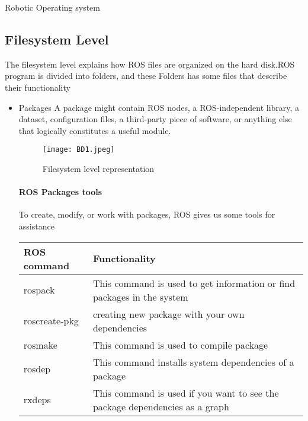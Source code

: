 \documentclass[a4paper]{book}
\begin{document}
\begin{chapter}{Robotic Operating system}
	\subsection{Filesystem Level}
The filesystem level explains how ROS files are organized on the hard disk.ROS program is divided into folders, and these Folders has some files that describe their functionality

 		 \begin{itemize}
  			\item Packages
  			\newline
  				A package might contain ROS nodes, a ROS-independent library, a dataset, configuration files, a third-party piece of software, or anything else that logically constitutes a useful module.
  	\begin{figure}[ht]
  		\centering
  		\caption{Filesystem level representation}
  		\texttt{[image: BD1.jpeg]}
  	\end{figure}
  			\paragraph{ROS Packages tools }
  	To create, modify, or work with packages, ROS gives us some tools for assistance
  	
  	\begin{table}[h!]
  		\centering
  		\begin{tabular}{| p{4cm} |p{7cm}|}
  			\hline
  			\large  ROS command  & \large Functionality\\
  			\hline
  			\large  rospack  & \large This command is used to get information or find packages in the system\\
  			\hline
  			\large  roscreate-pkg &\large creating new package with your own dependencies \\
  			\hline
  			 \large rosmake & \large This command is used to compile package\\
  			\hline
  			\large rosdep & \large This command installs system dependencies of a package\\
  			\hline 
  			\large rxdeps & \large This command is used if you want to see the package dependencies as a graph\\
  			\hline 
  			

\end{tabular}
\end{table}
\end{itemize}
\end{chapter}
\end{document}
